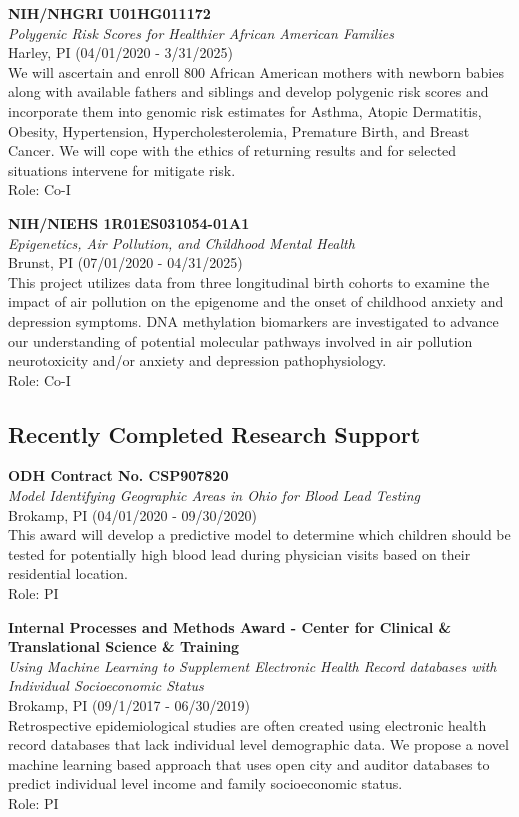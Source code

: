 \documentclass{nihbiosketch}
\begin{document}
\bigskip

\textbf{NIH/NHGRI U01HG011172}\\
\emph{Polygenic Risk Scores for Healthier African American Families}\\
Harley, PI (04/01/2020 - 3/31/2025)\\
We will ascertain and enroll 800 African American mothers with newborn babies along with available fathers and siblings and develop polygenic risk scores and incorporate them into genomic risk estimates for Asthma, Atopic Dermatitis, Obesity, Hypertension, Hypercholesterolemia, Premature Birth, and Breast Cancer. We will cope with the ethics of returning results and for selected situations intervene for mitigate risk.\\
Role: Co-I

\bigskip

\textbf{NIH/NIEHS 1R01ES031054-01A1}\\
\emph{Epigenetics, Air Pollution, and Childhood Mental Health}\\
Brunst, PI (07/01/2020 - 04/31/2025)\\
This project utilizes data from three longitudinal birth cohorts to examine the impact of air pollution on the epigenome and the onset of childhood anxiety and depression symptoms. DNA methylation biomarkers are investigated to advance our understanding of potential molecular pathways involved in air pollution neurotoxicity and/or anxiety and depression pathophysiology.\\
Role: Co-I

\bigskip

\subsection*{Recently Completed Research Support}

\bigskip

\textbf{ODH Contract No. CSP907820}\\
\emph{Model Identifying Geographic Areas in Ohio for Blood Lead Testing}\\
Brokamp, PI (04/01/2020 - 09/30/2020)\\
This award will develop a predictive model to determine which children should be
tested for potentially high blood lead during physician visits based on their
residential location. \\
Role: PI

\bigskip

\textbf{Internal Processes and Methods Award - Center for Clinical \&
  Translational Science \& Training}\\
\emph{Using Machine Learning to Supplement Electronic Health Record
  databases with Individual Socioeconomic Status}\\
Brokamp, PI (09/1/2017 - 06/30/2019)\\
Retrospective epidemiological studies are often created using electronic
health record databases that lack individual level demographic data. We
propose a novel machine learning based approach that uses open city and
auditor databases to predict individual level income and family
socioeconomic status.\\
Role: PI
\end{document}
